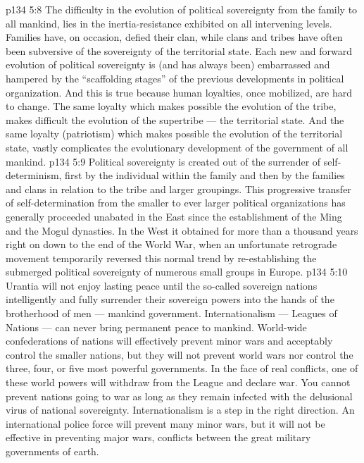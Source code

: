 \vs p134 5:8 The difficulty in the evolution of political sovereignty from the family to all mankind, lies in the inertia\hyp{}resistance exhibited on all intervening levels. Families have, on occasion, defied their clan, while clans and tribes have often been subversive of the sovereignty of the territorial state. Each new and forward evolution of political sovereignty is (and has always been) embarrassed and hampered by the “scaffolding stages” of the previous developments in political organization. And this is true because human loyalties, once mobilized, are hard to change. The same loyalty which makes possible the evolution of the tribe, makes difficult the evolution of the supertribe --- the territorial state. And the same loyalty (patriotism) which makes possible the evolution of the territorial state, vastly complicates the evolutionary development of the government of all mankind.
\vs p134 5:9 Political sovereignty is created out of the surrender of self\hyp{}determinism, first by the individual within the family and then by the families and clans in relation to the tribe and larger groupings. This progressive transfer of self\hyp{}determination from the smaller to ever larger political organizations has generally proceeded unabated in the East since the establishment of the Ming and the Mogul dynasties. In the West it obtained for more than a thousand years right on down to the end of the World War, when an unfortunate retrograde movement temporarily reversed this normal trend by re\hyp{}establishing the submerged political sovereignty of numerous small groups in Europe.
\vs p134 5:10 Urantia will not enjoy lasting peace until the so\hyp{}called sovereign nations intelligently and fully surrender their sovereign powers into the hands of the brotherhood of men --- mankind government. Internationalism --- Leagues of Nations --- can never bring permanent peace to mankind. World\hyp{}wide confederations of nations will effectively prevent minor wars and acceptably control the smaller nations, but they will not prevent world wars nor control the three, four, or five most powerful governments. In the face of real conflicts, one of these world powers will withdraw from the League and declare war. You cannot prevent nations going to war as long as they remain infected with the delusional virus of national sovereignty. Internationalism is a step in the right direction. An international police force will prevent many minor wars, but it will not be effective in preventing major wars, conflicts between the great military governments of earth.
